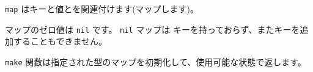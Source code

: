 \texttt{map} はキーと値とを関連付けます(マップします)。

マップのゼロ値は \texttt{nil} です。 \texttt{nil} マップは
キーを持っておらず、またキーを追加することもできません。

\texttt{make} 関数は指定された型のマップを初期化して、使用可能な状態で返します。